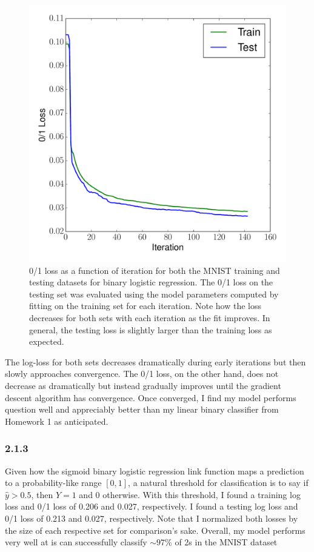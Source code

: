 \documentclass[12pt]{amsart}
\begin{document}
\begin{figure}[H]
	\includegraphics[width=\columnwidth]{mnist_bin_train_test_01.pdf}
    \caption{0/1 loss as a function of iteration for both the MNIST training and testing datasets for binary logistic regression.  The 0/1 loss on the testing set was evaluated using the model parameters computed by fitting on the training set for each iteration.  Note how the loss decreases for both sets with each iteration as the fit improves.  In general, the testing loss is slightly larger than the training loss as expected.}
    \label{fig:mnist_bin_01}
\end{figure}

The log-loss for both sets decreases dramatically during early iterations but then slowly approaches convergence.  The 0/1 loss, on the other hand, does not decrease as dramatically but instead gradually improves until the gradient descent algorithm has convergence.  Once converged, I find my model performs question well and appreciably better than my linear binary classifier from Homework 1 as anticipated.

\subsubsection*{2.1.3}
Given how the sigmoid binary logistic regression link function maps a prediction to a probability-like range $[0,1]$, a natural threshold for classification is to say if $\hat{y} > 0.5$, then $Y = 1$ and 0 otherwise.  With this threshold, I found a training log loss and 0/1 loss of 0.206 and 0.027, respectively.  I found a testing log loss and 0/1 loss of 0.213 and 0.027, respectively.  Note that I normalized both losses by the size of each respective set for comparison's sake.  Overall, my model performs very well at is can successfully classify ${\sim}97\%$ of 2s in the MNIST dataset
\end{document}
